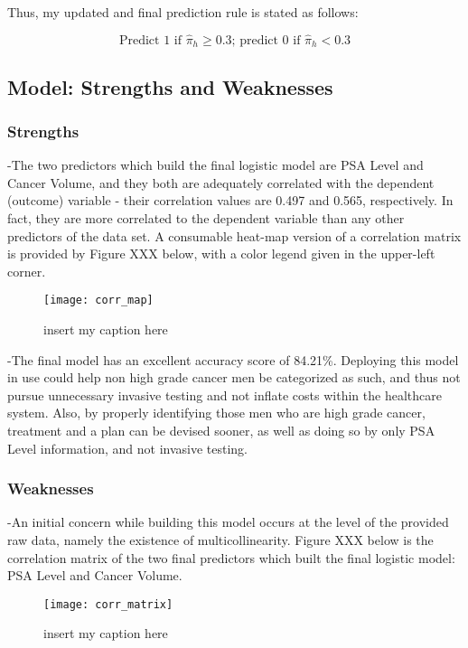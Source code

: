 Thus, my updated and final prediction rule is stated as follows:

\begin{equation}
	\textrm{Predict 1 if } \hat{\pi}_h \geq 0.3\textrm{; predict 0 if } \hat{\pi}_h < 0.3
\end{equation}

\subsection{Model: Strengths and Weaknesses}
\subsubsection{Strengths}
-The two predictors which build the final logistic model are PSA Level and Cancer Volume, and they both are adequately correlated with the dependent (outcome) variable - their correlation values are 0.497 and 0.565, respectively. In fact, they are more correlated to the dependent variable than any other predictors of the data set. A consumable heat-map version of a correlation matrix is provided by Figure XXX below, with a color legend given in the upper-left corner.

\begin{figure}[H]
	\centering
	\texttt{[image: corr\_map]}
	\caption{insert my caption here}
\end{figure}

-The final model has an excellent accuracy score of 84.21\%. Deploying this model in use could help non high grade cancer men be categorized as such, and thus not pursue unnecessary invasive testing and not inflate costs within the healthcare system. Also, by properly identifying those men who are high grade cancer, treatment and a plan can be devised sooner, as well as doing so by only PSA Level information, and not invasive testing. \\ 

\subsubsection{Weaknesses}
-An initial concern while building this model occurs at the level of the provided raw data, namely the existence of multicollinearity. Figure XXX below is the correlation matrix of the two final predictors which built the final logistic model: PSA Level and Cancer Volume.

\begin{figure}[H]
	\centering
	\texttt{[image: corr\_matrix]}
	\caption{insert my caption here}
\end{figure}

